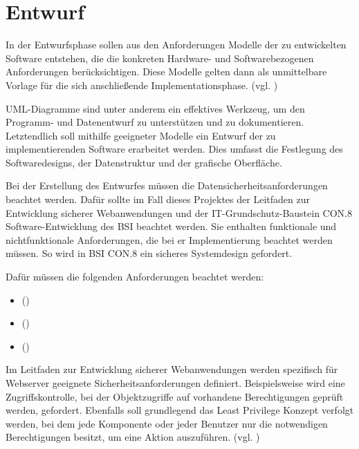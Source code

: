 \section{Entwurf}
\label{sec:Entwurf}
In der Entwurfsphase sollen aus den Anforderungen Modelle der zu entwickelten Software entstehen, die die konkreten Hardware- und Softwarebezogenen Anforderungen berücksichtigen. Diese Modelle gelten dann als unmittelbare Vorlage für die sich anschließende Implementationsphase. (vgl. \cite[S. 69]{dumke-2003})

UML-Diagramme sind unter anderem ein effektives Werkzeug, um den Programm- und Datenentwurf zu unterstützen und zu dokumentieren. Letztendlich soll mithilfe geeigneter Modelle ein Entwurf der zu implementierenden Software erarbeitet werden. Dies umfasst die Festlegung des Softwaredesigns, der Datenstruktur und der grafische Oberfläche.

Bei der Erstellung des Entwurfes müssen die Datensicherheitsanforderungen beachtet werden. Dafür sollte im Fall dieses Projektes der Leitfaden zur Entwicklung sicherer Webanwendungen und der IT-Grundschutz-Baustein CON.8 Software-Entwicklung des BSI beachtet werden. Sie enthalten funktionale und nichtfunktionale Anforderungen, die bei er Implementierung beachtet werden müssen. So wird in BSI CON.8 ein sicheres Systemdesign gefordert.
\newpage

Dafür müssen \ua die folgenden Anforderungen beachtet werden:
\begin{itemize}
    \item  {} (\cite[S.5]{BSICON8})
    \item  {} (\cite[S.5]{BSICON8})
    \item  {} (\cite[S.5]{BSICON8})
\end{itemize}

Im Leitfaden zur Entwicklung sicherer Webanwendungen werden spezifisch für Webserver geeignete Sicherheitsanforderungen definiert. Beispielsweise wird eine Zugriffskontrolle, bei der Objektzugriffe auf vorhandene Berechtigungen geprüft werden, gefordert. Ebenfalls soll grundlegend das Least Privilege Konzept verfolgt werden, bei dem jede Komponente oder jeder Benutzer nur die notwendigen Berechtigungen besitzt, um eine Aktion auszuführen. (vgl. \cite{BSIWeb})


